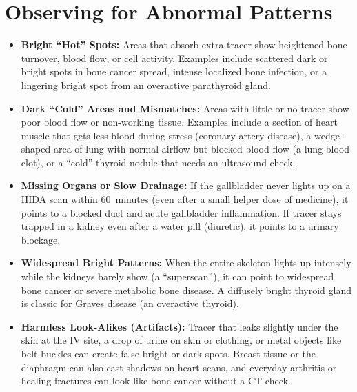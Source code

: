 \section{Observing for Abnormal Patterns}
\begin{itemize}
\item \textbf{Bright ``Hot'' Spots:} Areas that absorb extra tracer show heightened bone turnover, blood flow, or cell activity. Examples include scattered dark or bright spots in bone cancer spread, intense localized bone infection, or a lingering bright spot from an overactive parathyroid gland.
\item \textbf{Dark ``Cold'' Areas and Mismatches:} Areas with little or no tracer show poor blood flow or non-working tissue. Examples include a section of heart muscle that gets less blood during stress (coronary artery disease), a wedge-shaped area of lung with normal airflow but blocked blood flow (a lung blood clot), or a ``cold'' thyroid nodule that needs an ultrasound check.
\item \textbf{Missing Organs or Slow Drainage:} If the gallbladder never lights up on a HIDA scan within 60~minutes (even after a small helper dose of medicine), it points to a blocked duct and acute gallbladder inflammation. If tracer stays trapped in a kidney even after a water pill (diuretic), it points to a urinary blockage.
\item \textbf{Widespread Bright Patterns:} When the entire skeleton lights up intensely while the kidneys barely show (a ``superscan''), it can point to widespread bone cancer or severe metabolic bone disease. A diffusely bright thyroid gland is classic for Graves disease (an overactive thyroid).
\item \textbf{Harmless Look-Alikes (Artifacts):} Tracer that leaks slightly under the skin at the IV site, a drop of urine on skin or clothing, or metal objects like belt buckles can create false bright or dark spots. Breast tissue or the diaphragm can also cast shadows on heart scans, and everyday arthritis or healing fractures can look like bone cancer without a CT check.
\end{itemize}

